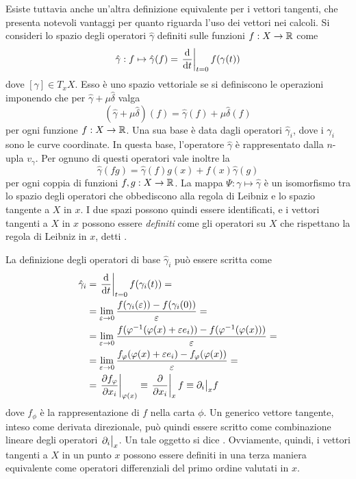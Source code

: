 Esiste tuttavia anche un'altra definizione equivalente per i vettori tangenti, che presenta notevoli vantaggi per quanto riguarda l'uso dei vettori nei calcoli. Si consideri lo spazio degli operatori $\hat{\gamma}$ definiti sulle funzioni $f: X \to \mathbb{R}$ come 
\begin{equation*}
  \hat{\gamma}: f \mapsto \hat{\gamma}(f) = \eval{\dv{t}}_{t=0} f(\gamma(t)) 
\end{equation*}
dove $[\gamma] \in T_x X$. Esso è uno spazio vettoriale se si definiscono le operazioni imponendo che per $\hat{\gamma} + \mu \hat{\delta}$ valga 
\begin{equation*}
  (\hat{\gamma} + \mu \hat{\delta}) (f) = \hat{\gamma}(f) + \mu \hat{\delta}(f)
\end{equation*}
per ogni funzione $f:X\to \mathbb{R}$. Una sua base è data dagli operatori $\hat{\gamma}_i$, dove i $\gamma_i$ sono le curve coordinate. In questa base, l'operatore $\hat{\gamma}$ è rappresentato dalla $n$-upla $v_\gamma$. Per ognuno di questi operatori vale inoltre la 
\begin{equation*}
\hat{\gamma}(fg) = \hat{\gamma}(f)g(x) + f(x)\hat{\gamma}(g)
\end{equation*}
per ogni coppia di funzioni $f,g:X\to \mathbb{R}$. La mappa $\Psi: \gamma \mapsto \hat{\gamma}$ è un isomorfismo tra lo spazio degli operatori che obbediscono alla regola di Leibniz e lo spazio tangente a $X$ in $x$. I due spazi possono quindi essere identificati, e i vettori tangenti a $X$ in $x$ possono essere \emph{definiti} come gli operatori su $X$ che rispettano la regola di Leibniz in $x$, detti .

La definizione degli operatori di base $\hat{\gamma}_i$ può essere scritta come \begin{equation*}
\begin{aligned}
  \hat{\gamma}_i &= \eval{\dv{t}}_{t=0} f(\gamma_i(t)) = \\
  &= \lim_{\epsilon \to 0} \frac{f(\gamma_i(\epsilon))-f(\gamma_i(0))}{\epsilon} = \\
  &= \lim_{\epsilon \to 0} \frac{f(\phi^{-1}(\phi(x)+\epsilon e_i))-f(\phi^{-1}(\phi(x)))}{\epsilon} = \\
  &= \lim_{\epsilon \to 0} \frac{f_{\phi}(\phi(x)+\epsilon e_i)-f_{\phi}(\phi(x))}{\epsilon} = \\
  &= \eval{\pdv{f_{\phi}}{x_i}}_{\phi(x)} \equiv \eval{\pdv{x_i}}_x f \equiv \partial_i\big|_x f
\end{aligned}
\end{equation*} 
dove $f_{\phi}$ è la rappresentazione di $f$ nella carta $\phi$. Un generico vettore tangente, inteso come derivata direzionale, può quindi essere scritto come combinazione lineare degli operatori $\eval{\partial_i}_x$. Un tale oggetto si dice . Ovviamente, quindi, i vettori tangenti a $X$ in un punto $x$ possono essere definiti in una terza maniera equivalente come operatori differenziali del primo ordine valutati in $x$.

